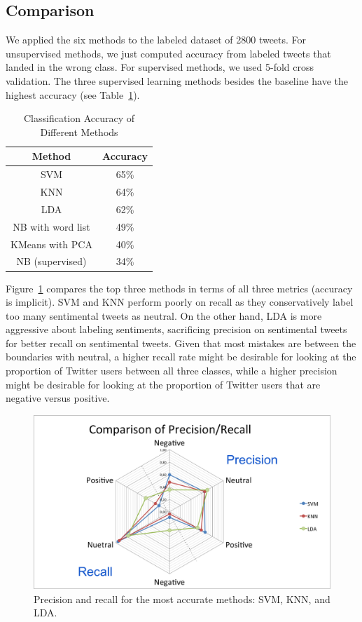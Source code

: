 \subsection{Comparison}

We applied
the six methods to the labeled dataset of 2800 tweets. For
unsupervised methods, we just computed accuracy from labeled tweets
that landed in the wrong class. For supervised methods, we used 5-fold
cross validation. The three supervised learning methods besides the
baseline have the highest accuracy (see Table~\ref{table:compare}).

\begin{table}[htb]
\center
\begin{tabular}{|c|c|}
    \hline
Method & Accuracy\\
\hline
SVM & 65\% \\
\hline
KNN & 64\% \\
\hline
LDA & 62\% \\
\hline
NB with word list & 49\% \\
\hline
KMeans with PCA & 40\% \\
\hline
NB (supervised) & 34\% \\
\hline
\end{tabular}
\caption{Classification Accuracy of Different Methods}
\label{table:compare}
\end{table}

Figure~\ref{fig:cob} compares the top three methods in terms of all
three metrics (accuracy is implicit). SVM and KNN perform poorly on
recall as they conservatively label too many sentimental tweets as
neutral. On the other hand, LDA is more aggressive about labeling
sentiments, sacrificing precision on sentimental tweets for better
recall on sentimental tweets. Given that
most mistakes are between the boundaries with neutral, a higher recall
rate might be desirable for looking at the proportion of Twitter users
between all three classes, while a higher precision might be desirable for
looking at the proportion of Twitter users that are negative versus
positive.


\begin{figure}[htb]
\begin{center}
  \includegraphics[width=0.9\columnwidth]{figs/cobweb.png}
\begin{minipage}{0.9\columnwidth}
\end{minipage}
\end{center}
\caption{Precision and recall for the most accurate methods: SVM, KNN,
    and LDA.}
\label{fig:cob}
\end{figure}


